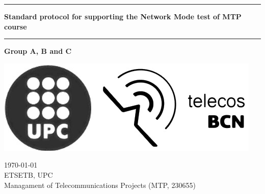 \begin{titlepage}
	\begin{center}
		\vspace*{1cm} %
		
		\huge

	\hrule
		\textbf{Standard protocol for supporting the Network Mode test of MTP course}


		\vspace{1cm}
	\hrule
		
		\vspace{2cm}
		\large

		\textbf{Group A, B and C}

		\vspace{6cm}
		\includegraphics[scale=0.35]{./titlepage/upc-telecos-bw.png}

		
		\vfill

	\end{center}
	
	\begin{flushright}
		\large	
		\UKvardate \today \\ %
		ETSETB, UPC \\ %
		Managament of Telecommunications Projects (MTP, 230655)
	\end{flushright}

\end{titlepage} 
